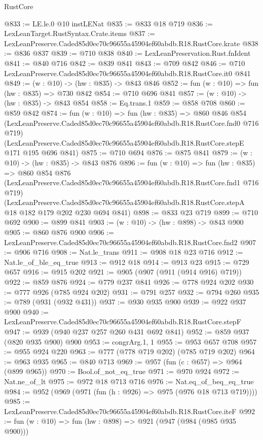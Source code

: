 \begin{lexlean}{RustCore}
\begin{coremodule}
@833 := LE.le.{0} @10 instLENat
@835 := @833 @18 @719
@836 := LexLeanTarget.RustSyntax.Crate.items
@837 := LexLeanPreserve.Caded85d0ec70c96655a45904ef60abdb.R18.RustCore.krate
@838 := @836 @837
@839 := @710 @838
@840 := LexLeanPreservation.Rust.fnIdent
@841 := @840 @716
@842 := @839 @841
@843 := @709 @842
@846 := @710 LexLeanPreserve.Caded85d0ec70c96655a45904ef60abdb.R18.RustCore.it0 @841
@849 := (w : @10) -> (hw : @835) -> @843 @846
@852 := fun (w : @10) => fun (hw : @835) => @730 @842
@854 := @710 @696 @841
@857 := (w : @10) -> (hw : @835) -> @843 @854
@858 := Eq.trans.{1}
@859 := @858 @708
@860 := @859 @842
@874 := fun (w : @10) =>
  fun (hw : @835) =>
  @860
    @846
    @854
    (LexLeanPreserve.Caded85d0ec70c96655a45904ef60abdb.R18.RustCore.fnd0 @716 @719)
    (LexLeanPreserve.Caded85d0ec70c96655a45904ef60abdb.R18.RustCore.stepE @171 @195 @696 @841)
@875 := @710 @694
@876 := @875 @841
@879 := (w : @10) -> (hw : @835) -> @843 @876
@896 := fun (w : @10) =>
  fun (hw : @835) =>
  @860
    @854
    @876
    (LexLeanPreserve.Caded85d0ec70c96655a45904ef60abdb.R18.RustCore.fnd1 @716 @719)
    (LexLeanPreserve.Caded85d0ec70c96655a45904ef60abdb.R18.RustCore.stepA
      @18
      @182
      @179
      @202
      @230
      @694
      @841)
@898 := @833 @23 @719
@899 := @710 @692
@900 := @899 @841
@903 := (w : @10) -> (hw : @898) -> @843 @900
@905 := @860 @876 @900
@906 := LexLeanPreserve.Caded85d0ec70c96655a45904ef60abdb.R18.RustCore.fnd2
@907 := @906 @716
@908 := Nat.le_trans
@911 := @908 @18 @23 @716
@912 := Nat.le_of_ble_eq_true
@913 := @912 @18
@914 := @913 @23
@915 := @729 @657
@916 := @915 @202
@921 := @905 (@907 (@911 (@914 @916) @719))
@922 := @859 @876
@924 := @779 @237 @841
@926 := @778 @924 @202
@930 := @777 @926 (@785 @924 @202)
@931 := @791 @257
@932 := @794 @260
@935 := @789 (@931 (@932 @431))
@937 := @930 @935 @900
@939 := @922 @937 @900
@940 := LexLeanPreserve.Caded85d0ec70c96655a45904ef60abdb.R18.RustCore.stepF
@947 := @939 (@940 @237 @257 @260 @431 @692 @841)
@952 := @859 @937 (@820 @935 @900) @900
@953 := congrArg.{1, 1}
@955 := @953 @657 @708
@957 := @955 @924 @220
@963 := @777 (@778 @719 @202) (@785 @719 @202)
@964 := @963 @935
@965 := @840 @713
@969 := @957 (fun (c : @657) => @964 (@899 @965))
@970 := Bool.of_not_eq_true
@971 := @970 @924
@972 := Nat.ne_of_lt
@975 := @972 @18 @713 @716
@976 := Nat.eq_of_beq_eq_true
@984 := @952 (@969 (@971 (fun (h : @926) => @975 (@976 @18 @713 @719))))
@985 := LexLeanPreserve.Caded85d0ec70c96655a45904ef60abdb.R18.RustCore.iteF
@992 := fun (w : @10) => fun (hw : @898) => @921 (@947 (@984 (@985 @935 @900)))

\end{coremodule}
\end{lexlean}

